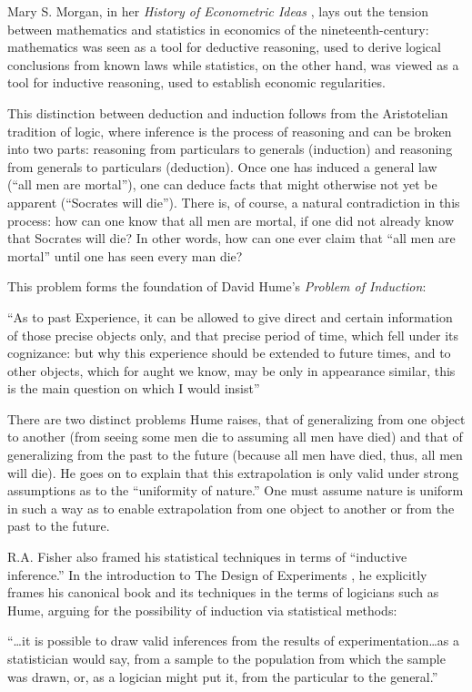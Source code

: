 \documentclass[a4paper,12pt]{article}
\begin{document}
Mary S. Morgan, in her \textit{History of Econometric Ideas} \parencite*{Morgan1991}, lays out the tension between mathematics and statistics in economics of the nineteenth-century: mathematics was seen as a tool for deductive reasoning, used to derive logical conclusions from known laws while statistics, on the other hand, was viewed as a tool for inductive reasoning, used to establish economic regularities.

This distinction between deduction and induction follows from the Aristotelian tradition of logic, where inference is the process of reasoning and can be broken into two parts: reasoning from particulars to generals (induction) and reasoning from generals to particulars (deduction). Once one has induced a general law (``all men are mortal''), one can deduce facts that might otherwise not yet be apparent (``Socrates will die''). There is, of course, a natural contradiction in this process: how can one know that all men are mortal, if one did not already know that Socrates will die? In other words, how can one ever claim that ``all men are mortal'' until one has seen every man die?

This problem forms the foundation of David Hume's \textit{Problem of Induction}:

\begin{displayquote}
``As to past Experience, it can be allowed to give direct and certain information of those precise objects only, and that precise period of time, which fell under its cognizance: but why this experience should be extended to future times, and to other objects, which for aught we know, may be only in appearance similar, this is the main question on which I would insist'' \parencite{hume1748}
\end{displayquote}

There are two distinct problems Hume raises, that of generalizing from one object to another (from seeing some men die to assuming all men have died) and that of generalizing from the past to the future (because all men have died, thus, all men will die). He goes on to explain that this extrapolation is only valid under strong assumptions as to the ``uniformity of nature.'' One must assume nature is uniform in such a way as to enable extrapolation from one object to another or from the past to the future.

R.A. Fisher also framed his statistical techniques in terms of ``inductive inference.'' In the introduction to The Design of Experiments \parencite*{Fisher1935}, he explicitly frames his canonical book and its techniques in the terms of logicians such as Hume, arguing for the possibility of induction via statistical methods:
%
\begin{displayquote}
``\ldots it is possible to draw valid inferences from the results of experimentation\ldots as a statistician would say, from a sample to the population from which the sample was drawn, or, as a logician might put it, from the particular to the general.'' \parencite{Fisher1935}
\end{displayquote}
\end{document}
